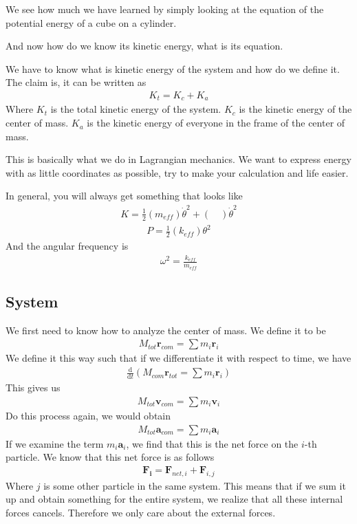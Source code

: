 \documentclass[12pt]{article}
\newcommand{\dydx}[2]{\frac{\text{d} #1}{\text{d} #2}}
\newcommand{\paren}[1]{\left( #1 \right)}
\begin{document}
We see how much we have learned by simply looking at the equation of the potential energy of a cube on a cylinder. 

And now how do we know its kinetic energy, what is its equation. 

We have to know what is kinetic energy of the system and how do we define it. The claim is, it can be written as
\begin{align}
K_t = K_c + K_a
\end{align}
Where $K_t$ is the total kinetic energy of the system. $K_c$ is the kinetic energy of the center of mass. $K_a$ is the kinetic energy of everyone in the frame of the center of mass. 

This is basically what we do in Lagrangian mechanics. We want to express energy with as little coordinates as possible, try to make your calculation and life easier. 

In general, you will always get something that looks like
\begin{align}
K = \frac{1}{2}\paren{m_{eff}}\dot{\theta}^2 + \paren{\quad} \dot{\theta}^2
\end{align}
\begin{align}
P = \frac{1}{2}\paren{k_{eff}}\theta^2
\end{align}
And the angular frequency is
\begin{align}
\omega^2 = \frac{k_{eff}}{m_{eff}}
\end{align}
\subsection{System}
We first need to know how to analyze the center of mass. We define it to be 
\begin{align}
M_{tot}\mathbf{r}_{com} = \sum m_i\mathbf{r}_i
\end{align}
We define it this way such that if we differentiate it with respect to time, we have
\begin{align}
\dydx{}{t}\paren{M_{com}\mathbf{r}_{tot} = \sum m_i\mathbf{r}_i}
\end{align}
This gives us
\begin{align}
M_{tot}\mathbf{v}_{com} = \sum m_i \mathbf{v}_i
\end{align}
Do this process again, we would obtain
\begin{align}
M_{tot}\mathbf{a}_{com} = \sum m_i \mathbf{a}_i
\end{align}
If we examine the term $m_i\mathbf{a}_i$, we find that this is the net force on the $i$-th particle. We know that this net force is as follows
\begin{align}
\mathbf{F_i} = \mathbf{F}_{net,i} + \mathbf{F}_{i,j}
\end{align}
Where $j$ is some other particle in the same system. This means that if we sum it up and obtain something for the entire system, we realize that all these internal forces cancels. Therefore we only care about the external forces. 
\end{document}

